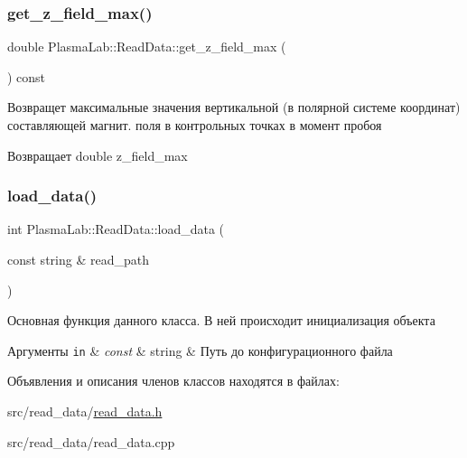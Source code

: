\subsubsection{\texorpdfstring{get\+\_\+z\+\_\+field\+\_\+max()}{get\_z\_field\_max()}}
{\footnotesize\ttfamily double Plasma\+Lab\+::\+Read\+Data\+::get\+\_\+z\+\_\+field\+\_\+max (\begin{DoxyParamCaption}{ }\end{DoxyParamCaption}) const\hspace{0.3cm}{\ttfamily [inline]}}

Возвращет максимальные значения вертикальной (в полярной системе координат) составляющей магнит. поля в контрольных точках в момент пробоя \begin{DoxyReturn}{Возвращает}
double z\+\_\+field\+\_\+max 
\end{DoxyReturn}
\mbox{\label{class_plasma_lab_1_1_read_data_ad83a5fc02efc593a8e91a45e1555be12}} 
\subsubsection{\texorpdfstring{load\+\_\+data()}{load\_data()}}
{\footnotesize\ttfamily int Plasma\+Lab\+::\+Read\+Data\+::load\+\_\+data (\begin{DoxyParamCaption}\item[{const string \&}]{read\+\_\+path }\end{DoxyParamCaption})}

Основная функция данного класса. В ней происходит инициализация объекта 
\begin{DoxyParams}[1]{Аргументы}
\mbox{\tt in}  & {\em const} & string \& Путь до конфигурационного файла \\
\hline
\end{DoxyParams}


Объявления и описания членов классов находятся в файлах\+:\begin{DoxyCompactItemize}
\item 
src/read\+\_\+data/\hyperlink{read__data_8h}{read\+\_\+data.\+h}\item 
src/read\+\_\+data/read\+\_\+data.\+cpp\end{DoxyCompactItemize}
